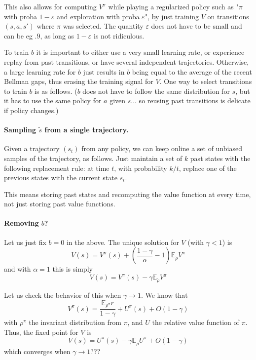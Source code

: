 \documentclass[11pt]{article}
\newcommand{\E}{\mathbb{E}}
\newcommand{\eps}{\varepsilon}
\begin{document}
This also allows for computing $V^\pi$ while playing a regularized policy
such as "$\pi$ with proba $1-\eps$ and exploration with proba $\eps$", by
just training $V$ on transitions $(s,a,s')$ where $\pi$ was selected. The
quantity $\eps$ does not have to be small and can be eg .9, as long as $1-\eps$ is not
ridiculous.

To train $b$ it is important to either use a very small learning rate, or
experience replay from past transitions, or have several independent
trajectories. Otherwise, a large learning rate
for $b$ just results in $b$ being equal to the average of the recent
Bellman gaps, thus erasing the training signal for $V$. One way to select
transitions to train $b$ is as follows. ($b$ does not have to follow the
same distribution for $s$, but it has to use the same policy for $a$
given $s$... so reusing
past transitions is
delicate if policy changes.)

\paragraph{Sampling $\tilde s$ from a single trajectory.} Given a
trajectory $(s_t)$ from any policy, we can keep online a set of unbiased
samples of the trajectory, as follows. Just maintain a set of $k$ past
states with the following replacement rule: at time $t$, with probability
$k/t$, replace one of the previous states with the current state $s_t$.

This means storing past states and recomputing the value function
at every time, not just storing past value functions.

\paragraph{Removing $b$?} Let us just fix $b=0$ in the above. The unique
solution for $V$ (with $\gamma<1$) is
\begin{equation}
V(s)=V^\pi(s)+\left(\frac{1-\gamma}{\alpha}-1\right)\E_{\tilde \rho} V^\pi
\end{equation}
and with $\alpha=1$ this is simply
\begin{equation}
V(s)=V^\pi(s)-\gamma \E_{\tilde \rho} V^\pi
\end{equation}

Let us check the behavior of this when $\gamma\to 1$. We know that
\begin{equation}
V^\pi(s)=\frac{\E_{\rho^\pi}r}{1-\gamma}+U^\pi(s)+O(1-\gamma)
\end{equation}
with $\rho^\pi$ the invariant distribution from $\pi$, and $U$ the
relative value function of $\pi$. Thus, the fixed point for $V$ is
\begin{equation}
V(s)=U^\pi(s)-\gamma \E_{\tilde \rho}U^\pi +O(1-\gamma)
\end{equation}
which converges when $\gamma\to 1$???
\end{document}
